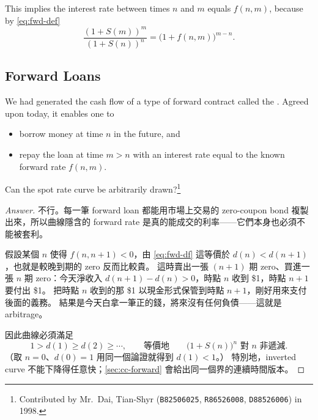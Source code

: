 This implies the interest rate between times $n$ and $m$ equals $f(n,m)$, because by \eqref{eq:fwd-def}
\[
	\frac{(1+S(m))^{m}}{(1+S(n))^{n}} = \bigl(1+f(n,m)\bigr)^{m-n} .
\]

\subsection{Forward Loans}


We had generated the cash flow of a type of forward contract called the .
Agreed upon today, it enables one to

\begin{itemize}[nosep]
	\item borrow money at time $n$ in the future, and
	\item repay the loan at time $m>n$ with an interest rate equal to the known forward rate $f(n,m)$.
\end{itemize}

\begin{question}
	Can the spot rate curve be arbitrarily drawn?\footnote{Contributed by Mr.~Dai, Tian-Shyr (\texttt{B82506025}, \texttt{R86526008}, \texttt{D88526006}) in 1998.}
\end{question}

\suppstart
\begin{proof}[Answer]
	不行。每一筆 forward loan 都能用市場上交易的 zero-coupon bond 複製出來，所以曲線隱含的 forward rate 是真的能成交的利率——它們本身也必須不能被套利。

	假設某個 $n$ 使得 $f(n,n+1)<0$，由 \eqref{eq:fwd-df} 這等價於 $d(n)<d(n+1)$，也就是較晚到期的 zero 反而比較貴。
	這時賣出一張 $(n+1)$ 期 zero、買進一張 $n$ 期 zero：今天淨收入 $d(n+1)-d(n)>0$，時點 $n$ 收到 \$1，時點 $n+1$ 要付出 \$1。
	把時點 $n$ 收到的那 \$1 以現金形式保管到時點 $n+1$，剛好用來支付後面的義務。
	結果是今天白拿一筆正的錢，將來沒有任何負債——這就是 arbitrage。

	因此曲線必須滿足
	\[
		1 > d(1) \ge d(2) \ge \cdots ,
		\qquad\text{等價地}\qquad
		\bigl(1+S(n)\bigr)^{n} \text{ 對 } n \text{ 非遞減} .
	\]
	（取 $n=0$、$d(0)=1$ 用同一個論證就得到 $d(1)<1$。）
	特別地，inverted curve 不能下降得任意快；\autoref{sec:cc-forward} 會給出同一個界的連續時間版本。
\end{proof}

